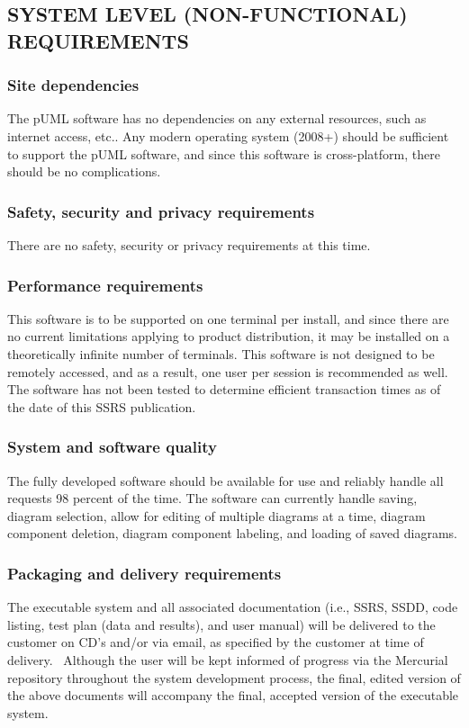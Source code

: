 \documentclass[twoside,letterpaper]{article}
\begin{document}
\subsection[SYSTEM LEVEL (NON{}-FUNCTIONAL)
REQUIREMENTS]{\bfseries
SYSTEM LEVEL (NON-FUNCTIONAL) REQUIREMENTS}

\subsubsection[Site dependencies]{\bfseries
Site dependencies}
{
The pUML software has no dependencies on any external resources, such as internet access, etc..
Any modern operating system (2008+) should be sufficient to support the pUML software,
and since this software is cross-platform, there should be no complications.
}

\subsubsection[Safety, security and privacy requirements]{\bfseries
Safety, security and privacy requirements}
{
There are no safety, security or privacy requirements at this time.
}

\subsubsection[Performance requirements]{\bfseries
Performance requirements}
{
This software is to be supported on one terminal per install, and since there are no current
 limitations applying to product distribution, it may be installed on a theoretically infinite 
number of terminals. This software is not designed to be remotely accessed, and as a result, 
one user per session is recommended as well.  The software has not been tested to determine 
efficient transaction times as of the date of this SSRS publication.
}

\subsubsection[System and software quality]{\bfseries System
and software quality}
{
The fully developed software should be available for use and reliably handle all requests 98 
percent of the time.  The software can currently handle saving, diagram selection, allow for 
editing of multiple diagrams at a time, diagram component deletion, diagram component labeling, 
and loading of saved diagrams.
}

\subsubsection[Packaging and delivery requirements]{\bfseries
Packaging and delivery requirements}
{
The executable system and all associated documentation (i.e., SSRS, SSDD, code listing, test plan (data and results), and user manual) will be delivered to the customer on CD{\textquoteright}s and/or via email, as
specified by the customer at time of delivery. \ Although the user will be kept informed of progress via the Mercurial repository throughout the
system development process, the final, edited version of the above
documents will accompany the final, accepted version of the executable
system.}
\end{document}
